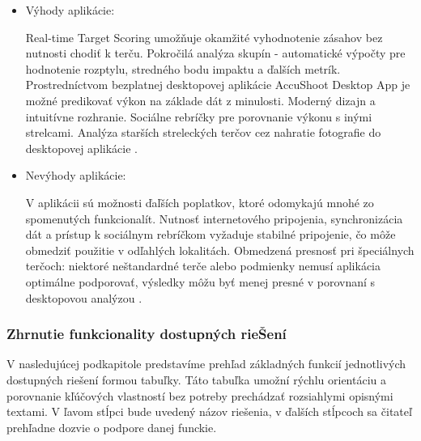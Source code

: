 \begin{itemize}
  \item Výhody aplikácie:

  Real-time Target Scoring umožňuje okamžité vyhodnotenie zásahov bez nutnosti chodiť k terču.  
  Pokročilá analýza skupín - automatické výpočty pre hodnotenie rozptylu, stredného bodu impaktu a ďalších metrík.
  Prostredníctvom bezplatnej desktopovej aplikácie AccuShoot Desktop App je možné predikovať výkon na základe dát z minulosti. 
  Moderný dizajn a intuitívne rozhranie.
  Sociálne rebríčky pre porovnanie výkonu s inými strelcami. 
  Analýza starších streleckých terčov cez nahratie fotografie do desktopovej aplikácie \cite{AccuShootApp}.

  \item Nevýhody aplikácie:

  V aplikácii sú možnosti ďaľších poplatkov, ktoré odomykajú mnohé zo spomenutých funkcionalít.
  Nutnosť internetového pripojenia, synchronizácia dát a prístup k sociálnym rebríčkom vyžaduje stabilné pripojenie, 
  čo môže obmedziť použitie v odľahlých lokalitách. 
  Obmedzená presnosť pri špeciálnych terčoch: niektoré neštandardné terče alebo podmienky nemusí aplikácia optimálne podporovať, 
  výsledky môžu byť menej presné v porovnaní s desktopovou analýzou \cite{AccuShootApp}.
\end{itemize}

\subsubsection{Zhrnutie funkcionality dostupných rieŠení}
V nasledujúcej podkapitole predstavíme prehľad základných funkcií jednotlivých dostupných riešení formou tabuľky. Táto tabuľka 
umožní rýchlu orientáciu a porovnanie kľúčových vlastností bez potreby prechádzať rozsiahlymi opisnými textami. V ľavom stĺpci 
bude uvedený názov riešenia, v ďalších stĺpcoch sa čitateľ prehľadne dozvie o podpore danej funckie.

